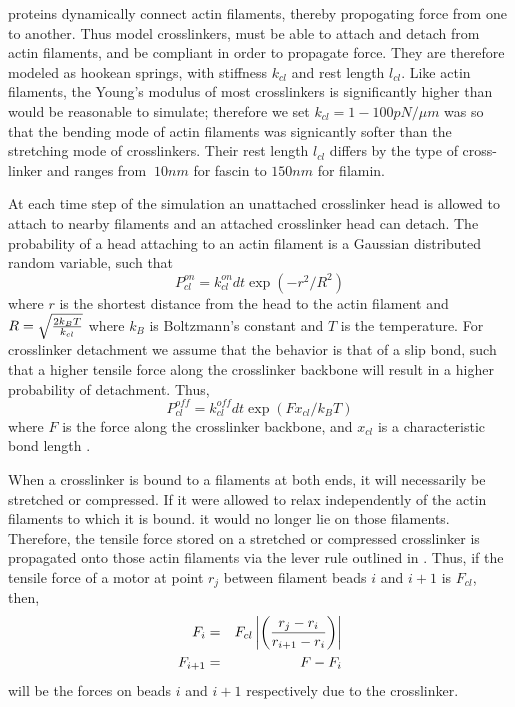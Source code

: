 \documentclass[12pt]{article} \usepackage{times} \usepackage{graphicx}
\begin{document}
proteins dynamically connect actin filaments, thereby propogating force from
one to another. Thus model crosslinkers, must be able to attach and detach from
actin filaments, and be compliant in order to propagate force. They are
therefore modeled as hookean springs, with stiffness $k_{cl}$ and rest length
$l_{cl}$. Like actin filaments, the Young's modulus of most crosslinkers is
significantly higher than would be reasonable to simulate; therefore we set
$k_{cl} = 1-100pN/\mu m$ was so that the bending mode of actin filaments was
signicantly softer than the stretching mode of crosslinkers. Their rest length
$l_{cl}$ differs by the type of cross-linker and ranges from $~10 nm$ for
fascin to $150 nm$ for filamin.  \par At each time step of the simulation an
unattached crosslinker head is allowed to attach to nearby filaments and an
attached crosslinker head can detach.  The probability of a head attaching to
an actin filament is a Gaussian distributed random variable, such that
\begin{equation} P_{cl}^{on} = k_{cl}^{on}dt\exp(-r^2/R^2) \label{eqn:cl_on}
\end{equation} where $r$ is the shortest distance from the head to the actin
filament and $R = \sqrt{2k_B T\over k_{cl}}$ where $k_B$ is Boltzmann's
constant and $T$ is the temperature.  For crosslinker detachment we assume that
the behavior is that of a slip bond, such that a higher tensile force along the
crosslinker backbone will result in a higher probability of detachment. Thus,
\begin{equation} P_{cl}^{off} = k_{cl}^{off} dt\exp{\left(  F x_{cl}/k_B
T\right)}  \label{eqn:cl_off} \end{equation} where $F$ is the force along the
crosslinker backbone, and $x_{cl}$ is a characteristic bond length
\cite{stam2015}.  \par When a crosslinker is bound to a filaments at both ends,
it will necessarily be stretched or compressed.  If it were allowed to relax
independently of the actin filaments to which it is bound.  it would no longer
lie on those filaments. Therefore, the tensile force stored on a stretched or
compressed crosslinker is propagated onto those actin filaments via the lever
rule outlined in \cite{nedelec2002, gordon2012}. Thus, if the tensile force of
a motor at point $r_j$ between filament beads $i$ and $i+1$ is $F_{cl}$, then,
\begin{eqnarray} F_i &=& F_{cl}\left|\left( {r_j - r_i \over r_{i+1} - r_i
}\right)\right|\\\nonumber F_{i+1} &=& F-F_i \label{eqn:lever} \end{eqnarray}
will be the forces on beads $i$ and $i+1$ respectively due to the crosslinker.
\end{document}
